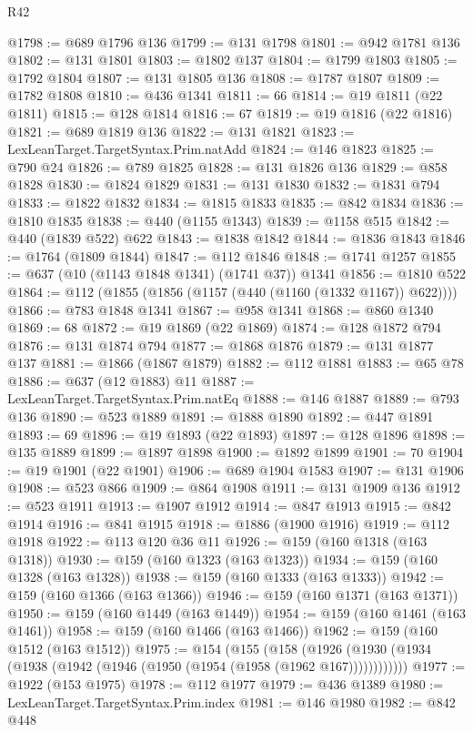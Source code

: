 \begin{lexlean}{R42}
\begin{coremodule}
@1798 := @689 @1796 @136
@1799 := @131 @1798
@1801 := @942 @1781 @136
@1802 := @131 @1801
@1803 := @1802 @137
@1804 := @1799 @1803
@1805 := @1792 @1804
@1807 := @131 @1805 @136
@1808 := @1787 @1807
@1809 := @1782 @1808
@1810 := @436 @1341
@1811 := 66
@1814 := @19 @1811 (@22 @1811)
@1815 := @128 @1814
@1816 := 67
@1819 := @19 @1816 (@22 @1816)
@1821 := @689 @1819 @136
@1822 := @131 @1821
@1823 := LexLeanTarget.TargetSyntax.Prim.natAdd
@1824 := @146 @1823
@1825 := @790 @24
@1826 := @789 @1825
@1828 := @131 @1826 @136
@1829 := @858 @1828
@1830 := @1824 @1829
@1831 := @131 @1830
@1832 := @1831 @794
@1833 := @1822 @1832
@1834 := @1815 @1833
@1835 := @842 @1834
@1836 := @1810 @1835
@1838 := @440 (@1155 @1343)
@1839 := @1158 @515
@1842 := @440 (@1839 @522) @622
@1843 := @1838 @1842
@1844 := @1836 @1843
@1846 := @1764 (@1809 @1844)
@1847 := @112 @1846
@1848 := @1741 @1257
@1855 := @637 (@10 (@1143 @1848 @1341) (@1741 @37)) @1341
@1856 := @1810 @522
@1864 := @112 (@1855 (@1856 (@1157 (@440 (@1160 (@1332 @1167)) @622))))
@1866 := @783 @1848 @1341
@1867 := @958 @1341
@1868 := @860 @1340
@1869 := 68
@1872 := @19 @1869 (@22 @1869)
@1874 := @128 @1872 @794
@1876 := @131 @1874 @794
@1877 := @1868 @1876
@1879 := @131 @1877 @137
@1881 := @1866 (@1867 @1879)
@1882 := @112 @1881
@1883 := @65 @78
@1886 := @637 (@12 @1883) @11
@1887 := LexLeanTarget.TargetSyntax.Prim.natEq
@1888 := @146 @1887
@1889 := @793 @136
@1890 := @523 @1889
@1891 := @1888 @1890
@1892 := @447 @1891
@1893 := 69
@1896 := @19 @1893 (@22 @1893)
@1897 := @128 @1896
@1898 := @135 @1889
@1899 := @1897 @1898
@1900 := @1892 @1899
@1901 := 70
@1904 := @19 @1901 (@22 @1901)
@1906 := @689 @1904 @1583
@1907 := @131 @1906
@1908 := @523 @866
@1909 := @864 @1908
@1911 := @131 @1909 @136
@1912 := @523 @1911
@1913 := @1907 @1912
@1914 := @847 @1913
@1915 := @842 @1914
@1916 := @841 @1915
@1918 := @1886 (@1900 @1916)
@1919 := @112 @1918
@1922 := @113 @120 @36 @11
@1926 := @159 (@160 @1318 (@163 @1318))
@1930 := @159 (@160 @1323 (@163 @1323))
@1934 := @159 (@160 @1328 (@163 @1328))
@1938 := @159 (@160 @1333 (@163 @1333))
@1942 := @159 (@160 @1366 (@163 @1366))
@1946 := @159 (@160 @1371 (@163 @1371))
@1950 := @159 (@160 @1449 (@163 @1449))
@1954 := @159 (@160 @1461 (@163 @1461))
@1958 := @159 (@160 @1466 (@163 @1466))
@1962 := @159 (@160 @1512 (@163 @1512))
@1975 := @154
    (@155
      (@158 (@1926 (@1930 (@1934 (@1938 (@1942 (@1946 (@1950 (@1954 (@1958 (@1962 @167))))))))))))
@1977 := @1922 (@153 @1975)
@1978 := @112 @1977
@1979 := @436 @1389
@1980 := LexLeanTarget.TargetSyntax.Prim.index
@1981 := @146 @1980
@1982 := @842 @448

\end{coremodule}
\end{lexlean}

